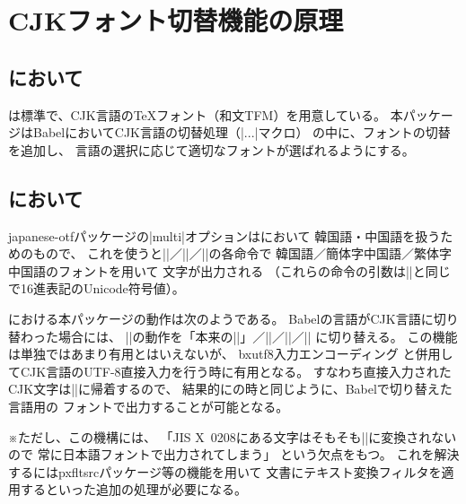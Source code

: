 \documentclass[uplatex,dvipdfmx,a4paper]{jsarticle}
\newcommand{\Pkg}[1]{\textsf{#1}}
\newcommand{\Note}{\par\noindent ※}
\newcommand{\XS}{\hspace{\xkanjiskip}}
\begin{document}
\section{CJKフォント切替機能の原理}
\label{sec:Switch-Font}

\subsection{{\upLaTeX}において}

{\upTeX}は標準で、CJK言語の{\TeX}フォント（和文TFM）を用意している。
本パッケージはBabelにおいてCJK言語の切替処理（|\extras...|\XS マクロ）
の中に、フォントの切替を追加し、
言語の選択に応じて適切なフォントが選ばれるようにする。

\subsection{{\pLaTeX}において}

\Pkg{japanese-otf}パッケージの|multi|オプションは{\pLaTeX}において
韓国語・中国語を扱うためのもので、
これを使うと\XS|\UTFK|／|\UTFC|／|\UTFT|の各命令で
韓国語／簡体字中国語／繁体字中国語のフォントを用いて
文字が出力される
（これらの命令の引数は\XS|\UTF|と同じで16進表記のUnicode符号値）。

{\pLaTeX}における本パッケージの動作は次のようである。
Babelの言語がCJK言語に切り替わった場合には、
|\UTF|の動作を「本来の\XS|\UTF|」／|\UTFK|／|\UTFC|／|\UTFT|
に切り替える。
この機能は単独ではあまり有用とはいえないが、
\Pkg{bxutf8}入力エンコーディング
と併用してCJK言語のUTF-8直接入力を行う時に有用となる。
すなわち直接入力されたCJK文字は\XS|\UTF|に帰着するので、
結果的に{\upLaTeX}の時と同じように、Babelで切り替えた言語用の
フォントで出力することが可能となる。

\Note ただし、この機構には、
「JIS X~0208にある文字はそもそも\XS|\UTF|に変換されないので
常に日本語フォントで出力されてしまう」
という欠点をもつ。
これを解決するには\Pkg{pxfltsrc}パッケージ等の機能を用いて
文書にテキスト変換フィルタを適用するといった追加の処理が必要になる。

\end{document}

